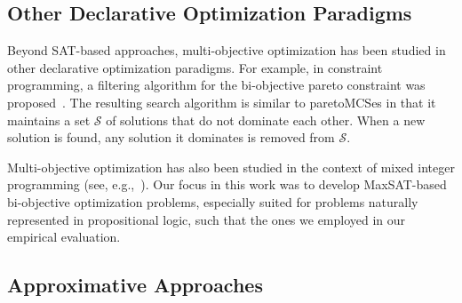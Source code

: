\subsection{Other Declarative Optimization Paradigms\label{sec:other-approaches}}


Beyond SAT-based approaches, multi-objective optimization has been studied in other declarative optimization paradigms.
For example, in  constraint programming, a filtering algorithm for the bi-objective pareto constraint was proposed~\autocite{DBLP:conf/aaai/HartertS14}.
The resulting search algorithm is similar to paretoMCSes in that it maintains a set $\mathcal{S}$ of solutions that do not dominate each other.
When a new solution is found, any solution it dominates is removed from $\mathcal{S}$.

Multi-objective optimization has also been studied in the context of mixed integer programming (see, e.g.,~\textcite{Rasmussen1986,DBLP:journals/ol/LuMS20,DBLP:journals/siamjo/SantisENR20,DBLP:journals/eor/AlvesC07}).
Our focus in this work was to develop MaxSAT-based bi-objective optimization problems, especially suited for problems naturally represented in propositional logic, such that the ones we employed in our empirical evaluation.

\subsection{Approximative Approaches\label{sec:approximative}}
